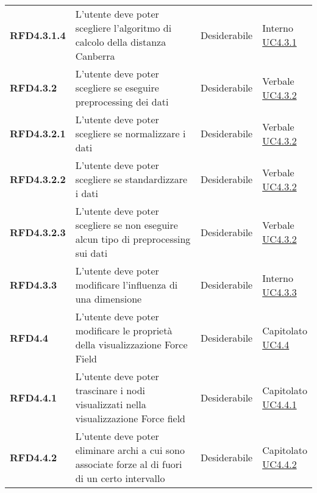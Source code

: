 \begin{longtable}[H]{| >{\raggedright\bfseries}m{20mm} | >{\raggedright}m{90mm} | >{\centering}m{25mm} | >{\centering\arraybackslash}m{30mm}|}
    RFD4.3.1.4
    & L'utente deve poter scegliere l'algoritmo di calcolo della distanza Canberra
    & Desiderabile
    & \makecell{ Interno \\ \hyperref[par:uc4.3.1]{UC4.3.1} }\\

    RFD4.3.2
    & L'utente deve poter scegliere se eseguire preprocessing dei dati
    & Desiderabile
    & \makecell{ Verbale \\ \hyperref[par:uc4.3.2]{UC4.3.2} }\\

    RFD4.3.2.1
    & L'utente deve poter scegliere se normalizzare i dati
    & Desiderabile
    & \makecell{ Verbale \\ \hyperref[par:uc4.3.2]{UC4.3.2} }\\

    RFD4.3.2.2
    & L'utente deve poter scegliere se standardizzare i dati
    & Desiderabile
    & \makecell{ Verbale \\ \hyperref[par:uc4.3.2]{UC4.3.2} }\\

    RFD4.3.2.3
    & L'utente deve poter scegliere se non eseguire alcun tipo di preprocessing sui dati
    & Desiderabile
    & \makecell{ Verbale \\ \hyperref[par:uc4.3.2]{UC4.3.2} }\\


    RFD4.3.3
    & L'utente deve poter modificare l'influenza di una dimensione
    & Desiderabile
    & \makecell{ Interno \\ \hyperref[par:uc4.3.3]{UC4.3.3} }\\

    RFD4.4
    & L'utente deve poter modificare le proprietà della visualizzazione Force Field
    & Desiderabile
    & \makecell{ Capitolato \\ \hyperref[ssub:uc4.4]{UC4.4} }\\

    RFD4.4.1
    & L'utente deve poter trascinare i nodi visualizzati nella visualizzazione Force field
    & Desiderabile
    & \makecell{ Capitolato \\ \hyperref[par:uc4.4.1]{UC4.4.1} }\\

    RFD4.4.2
    & L'utente deve poter eliminare archi a cui sono associate forze al di fuori di un certo intervallo
    & Desiderabile
    & \makecell{ Capitolato \\ \hyperref[par:uc4.4.2]{UC4.4.2} }\\


\end{longtable}
